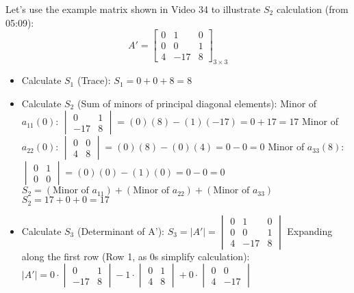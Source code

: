 \documentclass{article}
\begin{document}
\begin{itemize}
    Let's use the example matrix shown in Video 34 to illustrate $S_2$ calculation (from 05:09):
    \[ A' = \begin{bmatrix} 0 & 1 & 0 \\ 0 & 0 & 1 \\ 4 & -17 & 8 \end{bmatrix}_{3 \times 3} \]
    \begin{itemize}
        \item Calculate $S_1$ (Trace):
        $S_1 = 0 + 0 + 8 = 8$
       \item Calculate $S_2$ (Sum of minors of principal diagonal elements):
       Minor of $a_{11} (0)$: $\begin{vmatrix} 0 & 1 \\ -17 & 8 \end{vmatrix} = (0)(8) - (1)(-17) = 0 + 17 = 17$
       Minor of $a_{22} (0)$: $\begin{vmatrix} 0 & 0 \\ 4 & 8 \end{vmatrix} = (0)(8) - (0)(4) = 0 - 0 = 0$
       Minor of $a_{33} (8)$: $\begin{vmatrix} 0 & 1 \\ 0 & 0 \end{vmatrix} = (0)(0) - (1)(0) = 0 - 0 = 0$
       $S_2 = (\text{Minor of } a_{11}) + (\text{Minor of } a_{22}) + (\text{Minor of } a_{33})$
       $S_2 = 17 + 0 + 0 = 17$
       \item Calculate $S_3$ (Determinant of A'):
       $S_3 = |A'| = \begin{vmatrix} 0 & 1 & 0 \\ 0 & 0 & 1 \\ 4 & -17 & 8 \end{vmatrix}$
       Expanding along the first row (Row 1, as 0s simplify calculation):
       $|A'| = 0 \cdot \begin{vmatrix} 0 & 1 \\ -17 & 8 \end{vmatrix} - 1 \cdot \begin{vmatrix} 0 & 1 \\ 4 & 8 \end{vmatrix} + 0 \cdot \begin{vmatrix} 0 & 0 \\ 4 & -17 \end{vmatrix}$

\end{itemize}
\end{itemize}
\end{document}
